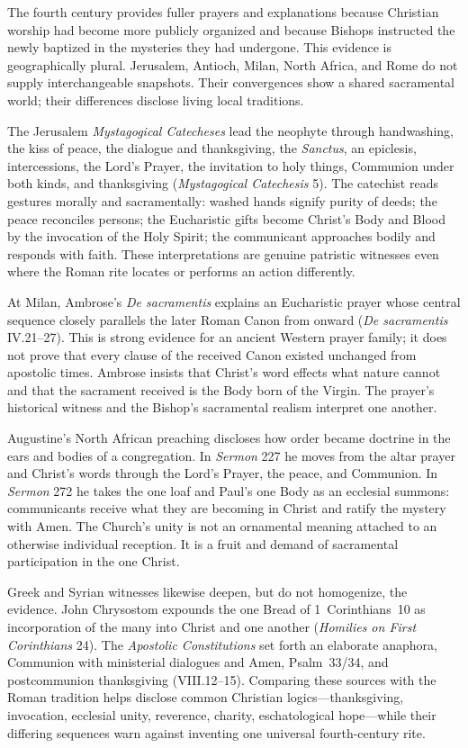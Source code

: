 The fourth century provides fuller prayers and explanations because Christian worship had become more publicly organized and because Bishops instructed the newly baptized in the mysteries they had undergone. This evidence is geographically plural. Jerusalem, Antioch, Milan, North Africa, and Rome do not supply interchangeable snapshots. Their convergences show a shared sacramental world; their differences disclose living local traditions.

The Jerusalem \emph{Mystagogical Catecheses} lead the neophyte through handwashing, the kiss of peace, the dialogue and thanksgiving, the \emph{Sanctus}, an epiclesis, intercessions, the Lord's Prayer, the invitation to holy things, Communion under both kinds, and thanksgiving (\emph{Mystagogical Catechesis} 5). The catechist reads gestures morally and sacramentally: washed hands signify purity of deeds; the peace reconciles persons; the Eucharistic gifts become Christ's Body and Blood by the invocation of the Holy Spirit; the communicant approaches bodily and responds with faith. These interpretations are genuine patristic witnesses even where the Roman rite locates or performs an action differently.

At Milan, Ambrose's \emph{De sacramentis} explains an Eucharistic prayer whose central sequence closely parallels the later Roman Canon from  onward (\emph{De sacramentis} IV.21--27). This is strong evidence for an ancient Western prayer family; it does not prove that every clause of the received Canon existed unchanged from apostolic times. Ambrose insists that Christ's word effects what nature cannot and that the sacrament received is the Body born of the Virgin. The prayer's historical witness and the Bishop's sacramental realism interpret one another.

Augustine's North African preaching discloses how order became doctrine in the ears and bodies of a congregation. In \emph{Sermon} 227 he moves from the altar prayer and Christ's words through the Lord's Prayer, the peace, and Communion. In \emph{Sermon} 272 he takes the one loaf and Paul's one Body as an ecclesial summons: communicants receive what they are becoming in Christ and ratify the mystery with Amen. The Church's unity is not an ornamental meaning attached to an otherwise individual reception. It is a fruit and demand of sacramental participation in the one Christ.

Greek and Syrian witnesses likewise deepen, but do not homogenize, the evidence. John Chrysostom expounds the one Bread of 1~Corinthians~10 as incorporation of the many into Christ and one another (\emph{Homilies on First Corinthians} 24). The \emph{Apostolic Constitutions} set forth an elaborate anaphora, Communion with ministerial dialogues and Amen, Psalm~33/34, and postcommunion thanksgiving (VIII.12--15). Comparing these sources with the Roman tradition helps disclose common Christian logics---thanksgiving, invocation, ecclesial unity, reverence, charity, eschatological hope---while their differing sequences warn against inventing one universal fourth-century rite.


